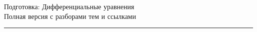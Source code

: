 \documentclass[11pt,a4paper]{article}
\newcommand{\topicsBase}{topics}
\begin{document}
\begin{center}
  {\Huge Подготовка: Дифференциальные уравнения}\\[0.4cm]
  {\large Полная версия с разборами тем и ссылками}\\[0.2cm]
  \rule{\textwidth}{0.6pt}
\end{center}

\vspace{1cm}

{
	\hypersetup{linkcolor=black}
	\tableofcontents
}

\newpage



% 
% 
\end{document}
